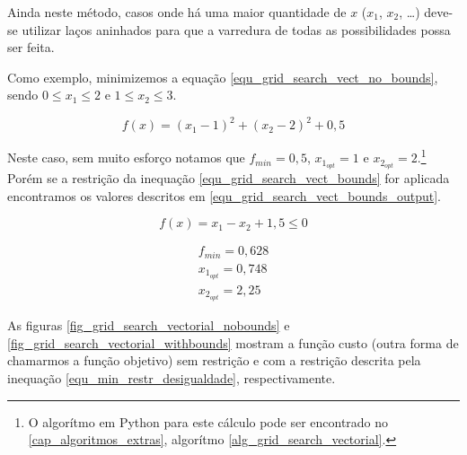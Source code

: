 Ainda neste método, casos onde há uma maior quantidade de $x$ ($x_1$, $x_2$, \dots)
deve-se utilizar laços aninhados para que a varredura de todas as possibilidades
possa ser feita. 

Como exemplo, minimizemos a equação \ref{equ_grid_search_vect_no_bounds}, sendo
$0 \leq x_1 \leq 2$ e $1 \leq x_2 \leq 3$.

\begin{equation}
	\label{equ_grid_search_vect_no_bounds}
	f(x) = (x_1 - 1)^2 + (x_2 - 2)^2 + 0,5
\end{equation}

Neste caso, sem muito esforço notamos que
$f_{min} = 0,5$, $x_{1_{opt}} = 1$ e $x_{2_{opt}} = 2$.\footnote{
	O algorítmo em Python para este cálculo pode ser encontrado no
	\autoref{cap_algoritmos_extras}, algorítmo \ref{alg_grid_search_vectorial}.}
Porém se a restrição da inequação \ref{equ_grid_search_vect_bounds} for aplicada
encontramos os valores descritos em \ref{equ_grid_search_vect_bounds_output}.

\begin{equation}
	\label{equ_grid_search_vect_bounds}
	f(x) = x_1 - x_2 + 1,5 \leq 0
\end{equation}

\begin{subequations}
	\label{equ_grid_search_vect_bounds_output}
	\begin{align}
		f_{min} = 0,628 \\
		x_{1_{opt}} = 0,748 \\
		x_{2_{opt}} = 2,25
	\end{align}
\end{subequations}

As figuras \ref{fig_grid_search_vectorial_nobounds} e \ref{fig_grid_search_vectorial_withbounds} mostram a função custo (outra forma de chamarmos a função objetivo) sem restrição e com a restrição descrita pela inequação \ref{equ_min_restr_desigualdade}, respectivamente.

